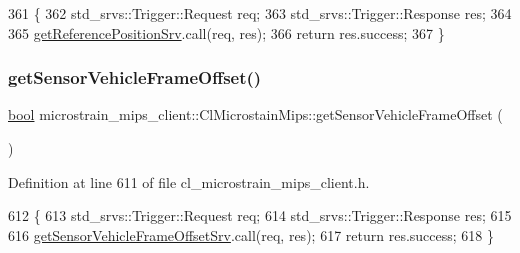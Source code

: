 \begin{DoxyCode}
361     \{
362         std\_srvs::Trigger::Request req;
363         std\_srvs::Trigger::Response res;
364 
365         \hyperlink{classmicrostrain__mips__client_1_1ClMicrostainMips_a9bf74f33ad09f1159a1b2a91e34df8e9}{getReferencePositionSrv}.call(req, res);
366         \textcolor{keywordflow}{return} res.success;
367     \}
\end{DoxyCode}
\mbox{\label{classmicrostrain__mips__client_1_1ClMicrostainMips_a3454a20d522e80b3ef3e423da72ef27e}} 
\subsubsection{\texorpdfstring{get\+Sensor\+Vehicle\+Frame\+Offset()}{getSensorVehicleFrameOffset()}}
{\footnotesize\ttfamily \hyperlink{classbool}{bool} microstrain\+\_\+mips\+\_\+client\+::\+Cl\+Microstain\+Mips\+::get\+Sensor\+Vehicle\+Frame\+Offset (\begin{DoxyParamCaption}{ }\end{DoxyParamCaption})\hspace{0.3cm}{\ttfamily [inline]}}



Definition at line 611 of file cl\+\_\+microstrain\+\_\+mips\+\_\+client.\+h.


\begin{DoxyCode}
612     \{
613         std\_srvs::Trigger::Request req;
614         std\_srvs::Trigger::Response res;
615 
616         \hyperlink{classmicrostrain__mips__client_1_1ClMicrostainMips_a95b89db0b03cffdb9b81cf1126e9e477}{getSensorVehicleFrameOffsetSrv}.call(req, res);
617         \textcolor{keywordflow}{return} res.success;
618     \}
\end{DoxyCode}
\mbox{\label{classmicrostrain__mips__client_1_1ClMicrostainMips_aacdca79f2e8ed62122552e8196c0c643}} 
